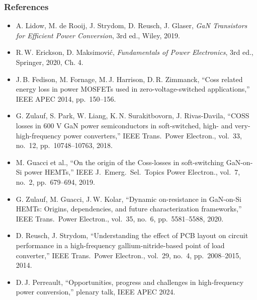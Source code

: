 \begin{frame}
	\frametitle{References}
	\scriptsize
	\begin{itemize}
		\item A. Lidow, M. de Rooij, J. Strydom, D. Reusch, J. Glaser, \textit{GaN Transistors for Efficient Power Conversion}, 3rd ed., Wiley, 2019.
		\item R.\,W. Erickson, D. Maksimovi\'c, \textit{Fundamentals of Power Electronics}, 3rd ed., Springer, 2020, Ch. 4.
		\item J.\,B. Fedison, M. Fornage, M.\,J. Harrison, D.\,R. Zimmanck, ``Coss related energy loss in power MOSFETs used in zero-voltage-switched applications,'' IEEE APEC 2014, pp.\ 150--156.
		\item G. Zulauf, S. Park, W. Liang, K.\,N. Surakitbovorn, J. Rivas-Davila, ``COSS losses in 600 V GaN power semiconductors in soft-switched, high- and very-high-frequency power converters,'' IEEE Trans.\ Power Electron., vol.\ 33, no.\ 12, pp.\ 10748--10763, 2018.
		\item M. Guacci et al., ``On the origin of the Coss-losses in soft-switching GaN-on-Si power HEMTs,'' IEEE J.\ Emerg.\ Sel.\ Topics Power Electron., vol.\ 7, no.\ 2, pp.\ 679--694, 2019.
		\item G. Zulauf, M. Guacci, J.\,W. Kolar, ``Dynamic on-resistance in GaN-on-Si HEMTs: Origins, dependencies, and future characterization frameworks,'' IEEE Trans.\ Power Electron., vol.\ 35, no.\ 6, pp.\ 5581--5588, 2020.
		\item D. Reusch, J. Strydom, ``Understanding the effect of PCB layout on circuit performance in a high-frequency gallium-nitride-based point of load converter,'' IEEE Trans.\ Power Electron., vol.\ 29, no.\ 4, pp.\ 2008--2015, 2014.
		\item D.\,J. Perreault, ``Opportunities, progress and challenges in high-frequency power conversion,'' plenary talk, IEEE APEC 2024.
	\end{itemize}
\end{frame}
